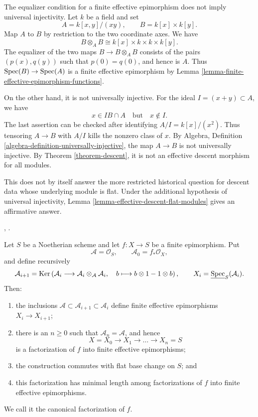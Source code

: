 \begin{example}
\label{example-finite-effective-epimorphism-not-pure}
The equalizer condition for a finite effective epimorphism does not imply
universal injectivity. Let $k$ be a field and set
$$
A = k[x, y]/(xy), \qquad B = k[x] \times k[y].
$$
Map $A$ to $B$ by restriction to the two coordinate axes. We have
$$
B \otimes_A B \cong k[x] \times k \times k \times k[y].
$$
The equalizer of the two maps $B \to B \otimes_A B$ consists of the pairs
$(p(x), q(y))$ such that $p(0) = q(0)$, and hence is $A$. Thus
$\mathop{\mathrm{Spec}}(B) \to \mathop{\mathrm{Spec}}(A)$ is a finite effective epimorphism by
Lemma \ref{lemma-finite-effective-epimorphism-functions}.

On the other hand, it is not universally injective. For the ideal
$I = (x + y) \subset A$, we have
$$
x \in IB \cap A \quad\text{but}\quad x \notin I.
$$
The last assertion can be checked after identifying
$A/I = k[x]/(x^2)$. Thus tensoring $A \to B$ with $A/I$ kills the
nonzero class of $x$. By Algebra, Definition
\ref{algebra-definition-universally-injective}, the map $A \to B$ is not
universally injective. By Theorem
\ref{theorem-descent}, it is not an effective descent morphism for all
modules.

This does not by itself answer the more restricted historical question for
descent data whose underlying module is flat. Under the additional
hypothesis of universal injectivity, Lemma
\ref{lemma-effective-descent-flat-modules} gives an affirmative answer.
\end{example}

\begin{theorem}
\label{theorem-finite-epimorphism-canonical-factorization}
\begin{reference}
\cite[Expos\'e 190, n\textsuperscript{o} 2(b), p. 306]{FGA},
\cite[Proposition 2.3.2]{Romagny-Rydh-Zalamansky}.
\end{reference}
Let $S$ be a Noetherian scheme and let $f : X \to S$ be a finite
epimorphism. Put
$$
\mathcal{A} = \mathcal{O}_S, \qquad
\mathcal{A}_0 = f_*\mathcal{O}_X,
$$
and define recursively
$$
\mathcal{A}_{i + 1} =
\mathop{\mathrm{Ker}}\left(
\mathcal{A}_i \longrightarrow
\mathcal{A}_i \otimes_{\mathcal{A}} \mathcal{A}_i,
\quad b \longmapsto b \otimes 1 - 1 \otimes b
\right),
\qquad
X_i = \underline{\mathop{\mathrm{Spec}}}_S(\mathcal{A}_i).
$$
Then:
\begin{enumerate}
\item the inclusions
$\mathcal{A} \subset \mathcal{A}_{i + 1} \subset \mathcal{A}_i$
define finite effective epimorphisms $X_i \to X_{i + 1}$;
\item there is an $n \geq 0$ such that $\mathcal{A}_n = \mathcal{A}$, and
hence
$$
X = X_0 \longrightarrow X_1 \longrightarrow \ldots
\longrightarrow X_n = S
$$
is a factorization of $f$ into finite effective epimorphisms;
\item the construction commutes with flat base change on $S$; and
\item this factorization has minimal length among factorizations of $f$
into finite effective epimorphisms.
\end{enumerate}
We call it the canonical factorization of $f$.
\end{theorem}

